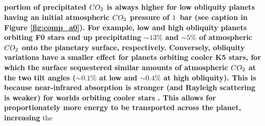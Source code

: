 \documentclass[fleqn,usenatbib]{mnras}
\providecommand{\DIFadd}[1]{{\bf #1}} %
\providecommand{\DIFdel}[1]{} %
\providecommand{\DIFaddbegin}{} %
\providecommand{\DIFaddend}{} %
\providecommand{\DIFdelbegin}{} %
\providecommand{\DIFdelend}{} %
\newcommand{\DIFscaledelfig}{0.5}
\newlength{\DIFdelgraphicswidth} %
\newlength{\DIFdelgraphicsheight} %
\newcommand{\DIFaddincludegraphics}[2][]{{\color{blue}\fbox{\DIFOincludegraphics[#1]{#2}}}} %
\newcommand{\DIFdelincludegraphics}[2][]{%
\sbox{\DIFdelgraphicsbox}{\DIFOincludegraphics[#1]{#2}}%
\settoboxwidth{\DIFdelgraphicswidth}{\DIFdelgraphicsbox} %
\settoboxtotalheight{\DIFdelgraphicsheight}{\DIFdelgraphicsbox} %
\scalebox{\DIFscaledelfig}{%
\parbox[b]{\DIFdelgraphicswidth}{\usebox{\DIFdelgraphicsbox}\\[-\baselineskip] \rule{\DIFdelgraphicswidth}{0em}}\llap{\resizebox{\DIFdelgraphicswidth}{\DIFdelgraphicsheight}{%
\setlength{\unitlength}{\DIFdelgraphicswidth}%
\begin{picture}(1,1)%
\thicklines\linethickness{2pt} %
{\color[rgb]{1,0,0}\put(0,0){\framebox(1,1){}}}%
{\color[rgb]{1,0,0}\put(0,0){\line( 1,1){1}}}%
{\color[rgb]{1,0,0}\put(0,1){\line(1,-1){1}}}%
\end{picture}%
}\hspace*{3pt}}} %
} %
\DeclareRobustCommand{\DIFaddbegin}{\DIFOaddbegin \let\includegraphics\DIFaddincludegraphics} %
\DeclareRobustCommand{\DIFaddend}{\DIFOaddend \let\includegraphics\DIFOincludegraphics} %
\DeclareRobustCommand{\DIFdelbegin}{\DIFOdelbegin \let\includegraphics\DIFdelincludegraphics} %
\DeclareRobustCommand{\DIFdelend}{\DIFOaddend \let\includegraphics\DIFOincludegraphics} %
\begin{document}
\subsection{\DIFdel{Fraction of surface $CO_{\mathrm{2}}$ ice}}
\addtocounter{subsection}{-1}%

\DIFdel{As shown by the Mars simulations of \citet{Soto2015}, the fraction of atmospheric $CO_{\mathrm{2}}$ that condenses onto the surface depends heavily on the atmospheric $CO_{\mathrm{2}}$ pressure and the planetary obliquity. Consistent with that study, we generally find that the amount of condensed $CO_{\mathrm{2}}$ ice (i. e., }\DIFdelend \DIFaddbegin \DIFadd{portion of precipitated $CO_{\rm 2}$ is always higher for low obliquity planets having an initial atmospheric $CO_{\rm 2}$ pressure of $1$~bar (see caption in Figure \ref{fig:comp_a0}). For example, low and high obliquity planets orbiting F0 stars end up precipitating $\sim 13 \%$ and $\sim 5\%$ of atmospheric $CO_{\rm 2}$ onto the planetary surface, respectively. Conversely, obliquity variations have a smaller effect for planets orbiting cooler K5 stars, for which the surface sequestered similar amounts of atmospheric $CO_{\rm 2}$ at the two tilt angles ($\sim 0.1 \%$ at low and $\sim 0.4\%$ at high obliquity). This is because near-infrared absorption is stronger (and Rayleigh scattering is weaker) for worlds orbiting cooler stars \citep{kasting1993}. This allows for proportionately more energy to be transported across the planet, increasing }\DIFaddend the \DIFdelbegin \DIFdel{fraction of initial atmospheric $CO_{\mathrm{2}}$ that precipitates onto the planetary surface) is highest at low obliquity ($0^{\circ}$) and at low/intermediate pressures (Figure~\ref{fig:CO2_ice}). Such a trend is expected because equator-pole transport is relatively weak at low obliquities and pressures, which favors  $CO_{\mathrm{2}}$ ice condensation at the poles. 
}%
\end{document}
